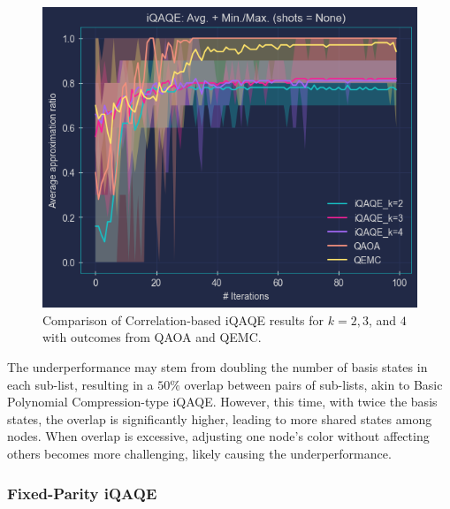 

\begin{figure}[H]
    \centering
    \includegraphics[width=0.95\columnwidth]{Figures/Correlation-based/k=2_3_4.png}
    \caption{Comparison of Correlation-based iQAQE results for $k=2, 3$, and $4$ with outcomes from QAOA and QEMC.}
    \label{fig:Correlation/k=2,3,4}
\end{figure}

The underperformance may stem from doubling the number of basis states in each sub-list, resulting in a $50\%$ overlap between pairs of sub-lists, akin to Basic Polynomial Compression-type iQAQE. However, this time, with twice the basis states, the overlap is significantly higher, leading to more shared states among nodes. When overlap is excessive, adjusting one node's color without affecting others becomes more challenging, likely causing the underperformance.

\subsubsection{Fixed-Parity iQAQE}
\label{subsubsection:Fixed-Parity_iQAQE}

